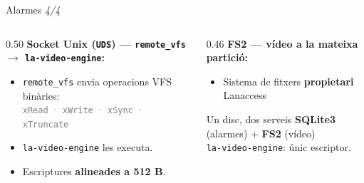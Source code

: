 \begin{frame}{Alarmes \small\textit{4/4}}
  \begin{columns}[T]
    \begin{column}{0.50\textwidth}
      \small
      \textbf{Socket Unix (\texttt{UDS}) — \texttt{remote\_vfs} $\to$ \texttt{la-video-engine}:}
      \begin{itemize}
        \item \texttt{remote\_vfs} envia operacions VFS binàries:\\
              {\footnotesize\textcolor{gray}{\texttt{xRead} · \texttt{xWrite} · \texttt{xSync} · \texttt{xTruncate}}}
        \item \texttt{la-video-engine} les executa.
        \item Escriptures \textbf{alineades a 512 B}.
      \end{itemize}
    \end{column}

    \begin{column}{0.46\textwidth}
      \small
      \textbf{FS2 — vídeo a la mateixa partició:}
      \begin{itemize}
        \item Sistema de fitxers \textbf{propietari} Lanaccess
      \end{itemize}

      \vspace{0.4em}
      \begin{exampleblock}{\small Un disc, dos serveis}
        \small \textbf{SQLite3} (alarmes) + \textbf{FS2} (vídeo)\\
        \texttt{la-video-engine}: únic escriptor.
      \end{exampleblock}
    \end{column}
  \end{columns}
\end{frame}

